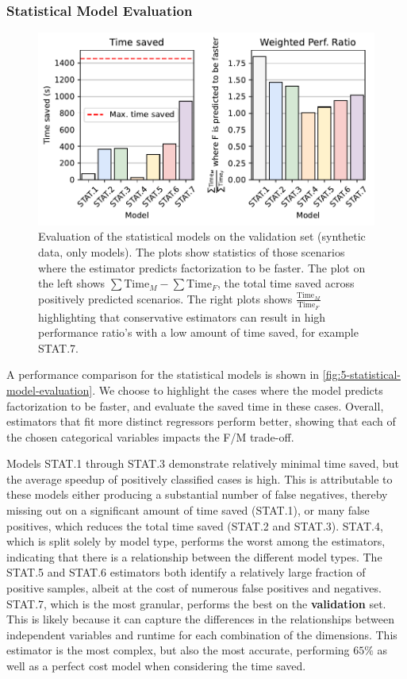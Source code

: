\subsubsection{Statistical Model Evaluation}
\begin{figure}[ht]
    \centering
    \includegraphics[width=0.75\linewidth]{chapters/05_cost_estimation/figures/stat-models-compare.pdf}
    \caption[Statistical Model Evaluation]{Evaluation of the statistical models on the validation set (synthetic data, only models). The plots show statistics of those scenarios where the estimator predicts factorization to be faster. The plot on the left shows $\sum \text{Time}_M - \sum \text{Time}_F$, the total time saved across positively predicted scenarios. The right plots shows $\frac{\text{Time}_M}{\text{Time}_F}$ highlighting that conservative estimators can result in high performance ratio's with a low amount of time saved, for example STAT.7.}
    \label{fig:5-statistical-model-evaluation}
\end{figure}

A performance comparison for the statistical models is shown in \autoref{fig:5-statistical-model-evaluation}. We choose to highlight the cases where the model predicts factorization to be faster, and evaluate the saved time in these cases. Overall, estimators that fit more distinct regressors perform better, showing that each of the chosen categorical variables impacts the F/M trade-off.

Models STAT.1 through STAT.3 demonstrate relatively minimal time saved, but the average speedup of positively classified cases is high. This is attributable to these models either producing a substantial number of false negatives, thereby missing out on a significant amount of time saved (STAT.1), or many false positives, which reduces the total time saved (STAT.2 and STAT.3). STAT.4, which is split solely by model type, performs the worst among the estimators, indicating that there is a relationship between the different model types. The STAT.5 and STAT.6 estimators both identify a relatively large fraction of positive samples, albeit at the cost of numerous false positives and negatives. STAT.7, which is the most granular, performs the best on the \textbf{validation} set. This is likely because it can capture the differences in the relationships between independent variables and runtime for each combination of the dimensions. This estimator is the most complex, but also the most accurate, performing $65\%$ as well as a perfect cost model when considering the time saved.

